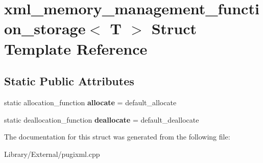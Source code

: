 \hypertarget{structxml__memory__management__function__storage}{}\section{xml\+\_\+memory\+\_\+management\+\_\+function\+\_\+storage$<$ T $>$ Struct Template Reference}
\label{structxml__memory__management__function__storage}
\subsection*{Static Public Attributes}
\begin{DoxyCompactItemize}
\item 
\hypertarget{structxml__memory__management__function__storage_abb6865f8d07d27fd9273737c59f6e941}{}static allocation\+\_\+function {\bfseries allocate} = default\+\_\+allocate\label{structxml__memory__management__function__storage_abb6865f8d07d27fd9273737c59f6e941}

\item 
\hypertarget{structxml__memory__management__function__storage_a1c80a9a045ed6cfb90b17a178e4b3512}{}static deallocation\+\_\+function {\bfseries deallocate} = default\+\_\+deallocate\label{structxml__memory__management__function__storage_a1c80a9a045ed6cfb90b17a178e4b3512}

\end{DoxyCompactItemize}


The documentation for this struct was generated from the following file\+:\begin{DoxyCompactItemize}
\item 
Library/\+External/pugixml.\+cpp\end{DoxyCompactItemize}
